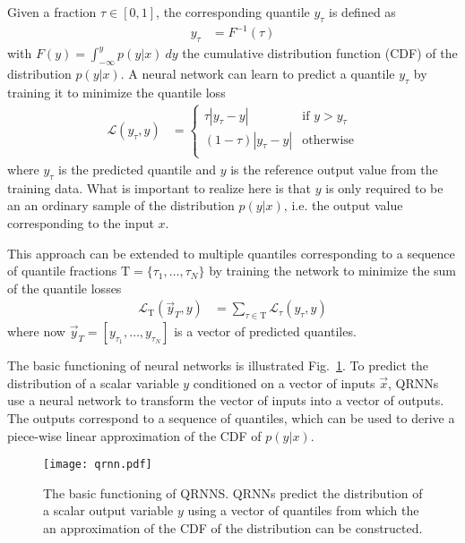 \begin{description}
Given a fraction $\tau \in [0, 1]$, the corresponding quantile $y_\tau$ is
defined as
\begin{align}
  y_\tau &= F^{-1}(\tau)
\end{align}
with $F(y) = \int_{-\infty}^y p(y|x)\ dy$ the cumulative distribution
function (CDF) of the distribution $p(y|x)$. A neural network can learn to predict a quantile
$y_\tau$ by training it to minimize the quantile loss
\begin{align}
  \mathcal{L}(y_\tau, y) &=
  \begin{cases}
    \tau  |y_\tau - y| & \text{if } y > y_\tau \\
    (1 - \tau)  |y_\tau - y| & \text{otherwise} \\
    \end{cases}
\end{align}
where $y_\tau$ is the predicted quantile and $y$ is the reference output value
from the training data. What is important to realize here is that $y$ is only
required to be an an ordinary sample of the distribution $p(y|x)$, i.e. the output
value corresponding to the input $x$.

This approach can be extended to multiple quantiles corresponding to
a sequence of quantile fractions $\mathrm{T} = \{\tau_1, \ldots, \tau_N\}$ by training
the network to minimize the sum of the quantile losses
\begin{align}
  \mathcal{L}_\mathrm{T}(\vec{y}_T, y) &= 
  \sum_{\tau \in \mathrm{T}} \mathcal{L}_\tau(y_\tau, y)
\end{align}
where now $\vec{y}_T = [y_{\tau_1}, \ldots, y_{\tau_N}]$ is a vector of predicted quantiles.

The basic functioning of neural networks is illustrated
Fig.~\ref{fig:machine_learning:qrnn}. To predict the distribution of a scalar
variable $y$ conditioned on a vector of inputs $\vec{x}$, QRNNs use a neural
network to transform the vector of inputs into a vector of outputs. The outputs
correspond to a sequence of quantiles, which can be used to derive a piece-wise
linear approximation of the CDF of $p(y|x)$.

\begin{figure}[btp]
  \centering
  \texttt{[image: qrnn.pdf]}
  \caption{The basic functioning of QRNNS. QRNNs predict the distribution of
    a scalar output variable $y$ using a vector of quantiles from which the
    an approximation of the CDF of the distribution can be constructed.}
  \label{fig:machine_learning:qrnn}
\end{figure}


\end{description}
